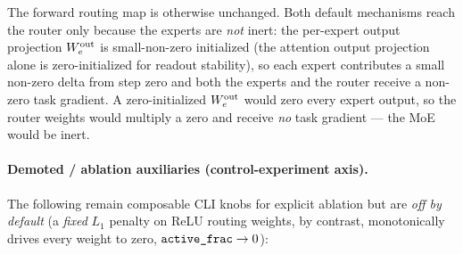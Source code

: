\documentclass[11pt]{article}
\newcommand{\code}[1]{\texttt{#1}}
\begin{document}
The forward routing map is otherwise unchanged.  Both default mechanisms reach the router only because
the experts are \emph{not} inert: the per-expert output projection \(W^{\rm out}_e\) is small-non-zero
initialized (the attention output projection alone is zero-initialized for readout stability), so each
expert contributes a small non-zero delta from step zero and both the experts and the router receive a
non-zero task gradient.  A zero-initialized \(W^{\rm out}_e\) would zero every expert output, so the
router weights would multiply a zero and receive \emph{no} task gradient --- the MoE would be inert.

\paragraph{Demoted / ablation auxiliaries (control-experiment axis).}
The following remain composable CLI knobs for explicit ablation but are \emph{off by default} (a
\emph{fixed} \(L_1\) penalty on ReLU routing weights, by contrast, monotonically drives every weight to
zero, \(\code{\detokenize{active_frac}}\to0\)):
\end{document}
